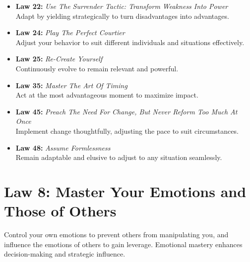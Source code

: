 \documentclass[a4paper,10.8pt]{article}
\begin{document}
\begin{itemize}[leftmargin=*, label={--}]
    \item \textbf{Law 22:} \textit{Use The Surrender Tactic: Transform Weakness Into Power} \\
    Adapt by yielding strategically to turn disadvantages into advantages.
    
    \item \textbf{Law 24:} \textit{Play The Perfect Courtier} \\
    Adjust your behavior to suit different individuals and situations effectively.
    
    \item \textbf{Law 25:} \textit{Re-Create Yourself} \\
    Continuously evolve to remain relevant and powerful.
    
    \item \textbf{Law 35:} \textit{Master The Art Of Timing} \\
    Act at the most advantageous moment to maximize impact.
    
    \item \textbf{Law 45:} \textit{Preach The Need For Change, But Never Reform Too Much At Once} \\
    Implement change thoughtfully, adjusting the pace to suit circumstances.
    
    \item \textbf{Law 48:} \textit{Assume Formlessness} \\
    Remain adaptable and elusive to adjust to any situation seamlessly.
\end{itemize}

\section*{Law 8: Master Your Emotions and Those of Others}
Control your own emotions to prevent others from manipulating you, and influence the emotions of others to gain leverage. Emotional mastery enhances decision-making and strategic influence.
\end{document}
